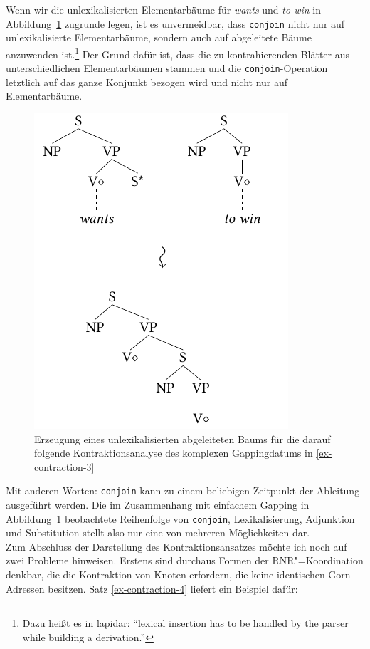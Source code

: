 Wenn wir die unlexikalisierten Elementarbäume für {\it wants} und {\it to win} in Abbildung~\ref{fig-contraction-4} zugrunde legen, ist es unvermeidbar, dass {\tt conjoin} nicht nur auf unlexikalisierte Elementarbäume, sondern auch auf abgeleitete Bäume anzuwenden ist.\footnote{Dazu hei\ss t es in \citet[21]{Sarkar:Joshi:97} lapidar: "`lexical insertion has to be handled by the parser while building a derivation."'} Der Grund dafür ist, dass die zu kontrahierenden Blätter aus unterschiedlichen Elementarbäumen stammen und die {\tt conjoin}-Operation letztlich auf das ganze Konjunkt bezogen wird und nicht nur auf Elementarbäume.
\begin{figure}[t]
\centering
\includegraphics{graphics/abb89.pdf}
\caption{\label{fig-contraction-4}Erzeugung eines unlexikalisierten abgeleiteten Baums für die darauf folgende Kontraktionsanalyse des komplexen Gappingdatums in \ref{ex-contraction-3}}
\end{figure}
Mit anderen Worten: {\tt conjoin} kann zu einem beliebigen Zeitpunkt der Ableitung ausgeführt werden. Die im Zusammenhang mit einfachem Gapping in Abbildung~\ref{fig-contraction-4} beobachtete Reihenfolge von {\tt conjoin}, Lexikalisierung, Adjunktion und Substitution stellt also nur eine von mehreren Möglichkeiten dar.\\  

Zum Abschluss der Darstellung des Kontraktionsansatzes möchte ich noch auf zwei Probleme hinweisen. Erstens sind durchaus Formen der RNR"=Koordination denkbar, die die Kontraktion von Knoten erfordern, die keine identischen Gorn-Adressen besitzen. Satz \ref{ex-contraction-4} liefert ein Beispiel dafür:  

